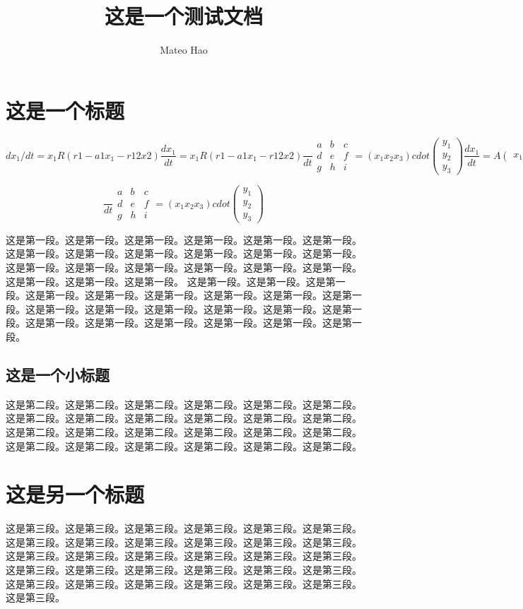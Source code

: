 \documentclass{article}
\title{这是一个测试文档}
\author{Mateo Hao}
\begin{document}
\maketitle{}


 \section{这是一个标题}


\[dx_{1}/dt=x_{1}R(r1-a1x_{1}-r12x2)\frac{dx_{1}}{dt}=x_{1}R(r1-a1x_{1}-r12x2)\frac{}{dt}\begin{matrix}a&b&c\\d&e&f\\g&h&i\end{matrix}=(x_{1}x_{2}x_{3})cdot{}(\begin{matrix}y_{1}\\y_{2}\\y_{3}\end{matrix}){\frac{dx_{1}}{dt}=A(\begin{matrix}x_{1};x_{2}\end{matrix})\frac{dx_{2}}{dt}=A(\begin{matrix}x_{1};x_{2}\end{matrix}).}\]

\[\frac{}{dt}\begin{matrix}a&b&c\\d&e&f\\g&h&i\end{matrix}=(x_{1}x_{2}x_{3})cdot{}(\begin{matrix}y_{1}\\y_{2}\\y_{3}\end{matrix})\]

这是第一段。这是第一段。这是第一段。这是第一段。这是第一段。这是第一段。这是第一段。这是第一段。这是第一段。这是第一段。这是第一段。这是第一段。这是第一段。这是第一段。这是第一段。这是第一段。这是第一段。这是第一段。这是第一段。这是第一段。这是第一段。 这是第一段。这是第一段。这是第一段。这是第一段。这是第一段。这是第一段。这是第一段。这是第一段。这是第一段。这是第一段。这是第一段。这是第一段。这是第一段。这是第一段。这是第一段。这是第一段。这是第一段。这是第一段。这是第一段。这是第一段。这是第一段。

\subsection{这是一个小标题}


这是第二段。这是第二段。这是第二段。这是第二段。这是第二段。这是第二段。这是第二段。这是第二段。这是第二段。这是第二段。这是第二段。这是第二段。这是第二段。这是第二段。这是第二段。这是第二段。这是第二段。这是第二段。这是第二段。这是第二段。这是第二段。这是第二段。这是第二段。这是第二段。

\section{这是另一个标题}


这是第三段。这是第三段。这是第三段。这是第三段。这是第三段。这是第三段。这是第三段。这是第三段。这是第三段。这是第三段。这是第三段。这是第三段。这是第三段。这是第三段。这是第三段。这是第三段。这是第三段。这是第三段。这是第三段。这是第三段。这是第三段。这是第三段。这是第三段。这是第三段。这是第三段。这是第三段。这是第三段。这是第三段。这是第三段。这是第三段。这是第三段。
\end{document}
